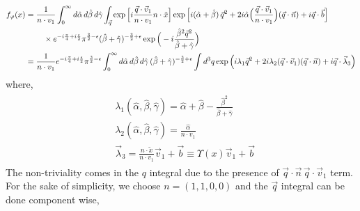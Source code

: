 \begin{align}
    \begin{split}
        f_{\varphi}(x)&=\frac{1}{n\cdot v_1}\int_{0}^{\infty}d\hat\alpha\,d\hat\beta\,d\hat\gamma \int_{\vec q}\exp\Big[i\frac{\vec q\cdot \vec v_1}{n\cdot v_1}n\cdot \tilde x\Big]\exp\Big[i(\hat\alpha+\hat\beta)\,\vec q^2+2i\hat\alpha \Big(\frac{\vec q\cdot \vec v_1}{n\cdot v_1}\Big)(\vec q\cdot \vec n)+i\vec q\cdot \vec b\Big]\\ &
    \hspace{0.8cm} \times e^{-i\frac{\pi}{4}+i\frac{\epsilon}{2}}\pi^{\frac{3}{2}-\epsilon}(\hat\beta+\hat\gamma)^{-\frac{3}{2}+\epsilon}\exp\Big(-i \frac{\hat\beta^2 \vec q^2}{\hat\beta +\hat\gamma}\Big)\\ &
    =\frac{1}{n\cdot v_1}e^{-i\frac{\pi}{4}+i\frac{\epsilon}{2}}\pi^{\frac{3}{2}-\epsilon}\int_{0}^{\infty}d\hat\alpha\,d\hat\beta\,d\hat\gamma \,(\hat\beta+\hat\gamma)^{-\frac{3}{2}+\epsilon}\int d^3q \exp\Big(i\lambda_1 \vec q^2+2i \lambda_2 (\vec q\cdot \vec v_1)(\vec q\cdot \vec n)+i\vec q\cdot \vec \lambda_3\Big)\label{5.16k}
    \end{split}
\end{align}
where,
\begin{align}
    \begin{split}
&\lambda_1(\hat\alpha,\hat\beta,\hat\gamma)=\hat\alpha+\hat\beta -\frac{\hat\beta^2}{\hat\beta +\hat\gamma}\\ &
\lambda_2(\hat\alpha,\hat\beta,\hat\gamma)=\frac{\hat\alpha }{n\cdot v_1}\\ &
\vec \lambda_3=\frac{n\cdot \tilde x}{n\cdot v_1}\vec v_1+\vec b\equiv \Upsilon(x)\vec v_1+\vec b
    \end{split}
\end{align}
The non-triviality comes in the $q$ integral due to the presence of $\vec q\cdot \vec n\,\vec q\cdot \vec v_1$ term. For the sake of simplicity, we choose $ n=(1,1,0,0)$ and the $\vec q$ integral can be done component wise,
